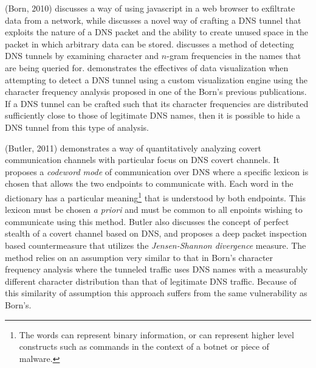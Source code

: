 \documentclass[12pt]{article}
\theoremstyle{remark}
\theoremstyle{definition}
\theoremstyle{definition}
\theoremstyle{definition}
\begin{document}
(Born, 2010)\cite{Born2010.exfil} discusses a way of using javascript in a web browser to exfiltrate data from a network, while \cite{Born2010.psudp} discusses a novel way of crafting a DNS tunnel that exploits the nature of a DNS packet and the ability to create unused space in the packet in which arbitrary data can be stored. \cite{Born2010.cfa} discusses a method of detecting DNS tunnels by examining character and $n$-gram frequencies in the names that are being queried for. \cite{Born2010.ngviz} demonstrates the effectives of data visualization when attempting to detect a DNS tunnel using a custom visualization engine using the character frequency analysis proposed in one of the Born's previous publications. If a DNS tunnel can be crafted such that its character frequencies are distributed sufficiently close to those of legitimate DNS names, then it is possible to hide a DNS tunnel from this type of analysis.

(Butler, 2011)\cite{Butler, 2011} demonstrates a way of quantitatively analyzing covert communication channels with particular focus on DNS covert channels. It proposes a \emph{codeword mode} of communication over DNS where a specific lexicon is chosen that allows the two endpoints to communicate with. Each word in the dictionary has a particular meaning\footnote{The words can represent binary information, or can represent higher level constructs such as commands in the context of a botnet or piece of malware.} that is understood by both endpoints. This lexicon must be chosen \emph{a priori} and must be common to all enpoints wishing to communicate using this method. Butler also discusses the concept of perfect stealth of a covert channel based on DNS, and proposes a deep packet inspection based countermeasure that utilizes the \emph{Jensen-Shannon divergence} measure. The method relies on an assumption very similar to that in Born's character frequency analysis where the tunneled traffic uses DNS names with a measurably different character distribution than that of legitimate DNS traffic. Because of this similarity of assumption this approach suffers from the same vulnerability as Born's.
\end{document}
